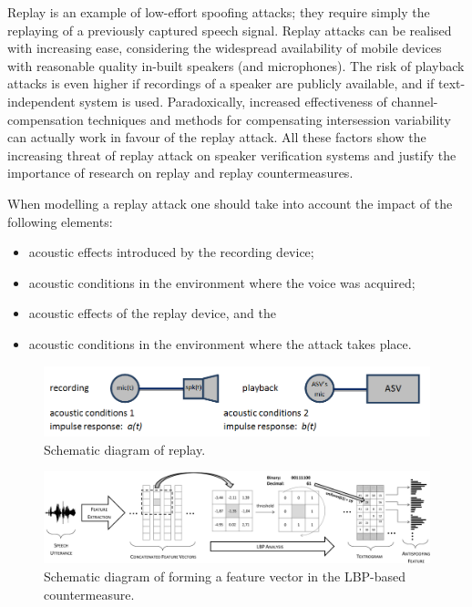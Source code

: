 
Replay is an example of low-effort spoofing attacks; they require simply the replaying of a previously captured speech signal. Replay attacks can be realised with increasing ease, considering the widespread availability of mobile devices with reasonable quality in-built speakers (and microphones). The risk of playback attacks is even higher if recordings of a speaker are publicly available, and if text-independent system is used. Paradoxically, increased effectiveness of channel-compensation techniques and methods for compensating intersession variability can actually work in favour of the replay attack. All these factors show the increasing threat of replay attack on speaker verification systems and justify the importance of research on replay and replay countermeasures.

When modelling a replay attack one should take into account the impact of the following elements:
\begin{itemize}
\item acoustic effects introduced by the recording device;
\item acoustic conditions in the environment where the voice was acquired;
\item acoustic effects of the replay device, and the
\item acoustic conditions in the environment where the attack takes place. 
\end{itemize}

\begin{figure}
	\includegraphics[width=1\linewidth]{Figs/replay.png}

	\caption{Schematic diagram of replay.}
	\label{fig::Replay}
\end{figure}


\begin{figure}
	\includegraphics[width=1\linewidth]{Figs/LBPfeature.pdf}

	\caption{Schematic diagram of forming a feature vector in the LBP-based countermeasure.}
	\label{fig:LBPfeature}
\end{figure}



